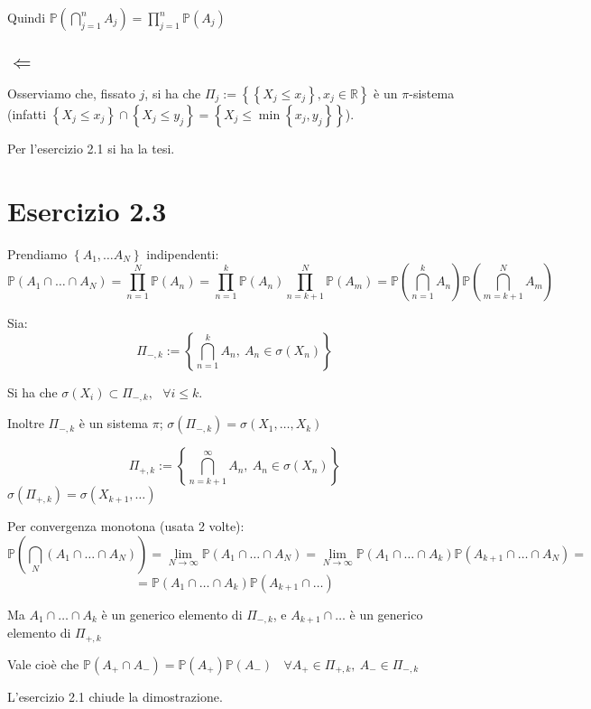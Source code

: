 \documentclass{article}
\begin{document}
Quindi $\mathbb{P}\left(\bigcap_{j=1}^{n} A_j\right) = \prod_{j=1}^{n} \mathbb{P}(A_j)$

\subsection{$\Leftarrow $}
Osserviamo che, fissato $j$, si ha che $\Pi_j := \left\{\left\{X_j \leq  x_j\right\}, x_j \in \mathbb{R}\right\}$ è un $\pi$-sistema (infatti $\left\{X_j \leq  x_j\right\} \cap \left\{X_j \leq  y_j\right\} = \left\{X_j \leq  \min\left\{x_j, y_j\right\}\right\}$).

Per l'esercizio 2.1 si ha la tesi.

\section{Esercizio 2.3}
Prendiamo $\left\{A_1,\dots A_N\right\}$ indipendenti:
\[
	\mathbb{P}\left(A_1\cap \dots \cap A_N\right) = \prod_{n=1}^{N}\mathbb{P}(A_n) = \prod_{n=1}^{k}\mathbb{P}(A_n)\prod_{n=k+1}^{N}\mathbb{P}(A_m)=\mathbb{P}\left(\bigcap_{n=1}^{k} A_n\right) \mathbb{P}\left(\bigcap _{m=k+1}^N A_m\right)
\]

Sia:
\[\Pi _{-,k} := \left\{\bigcap _{n=1}^k A_n,\ A_n\in \sigma (X_n)\right\}\]

Si ha che $\sigma (X_i) \subset \Pi _{-,k},\ \ \ \forall i\leq k$.

Inoltre $\Pi _{-,k}$ è un sistema $\pi $;    $\sigma (\Pi _{-,k}) = \sigma (X_1,\dots,X_k)$

\[\Pi _{+,k} := \left\{\bigcap _{n=k+1}^\infty  A_n,\ A_n\in \sigma (X_n)\right\}\]
$\sigma (\Pi _{+,k}) = \sigma (X_{k+1},\dots)$

Per convergenza monotona (usata 2 volte):
\[
	\mathbb{P}\left(\bigcap _N \left(A_1 \cap \dots \cap A_N\right)\right) = \lim_{N\rightarrow \infty }\mathbb{P}\left(A_1\cap \dots\cap A_N\right) = \lim_{N\rightarrow \infty } \mathbb{P}\left(A_1\cap \dots\cap A_k\right)\mathbb{P}\left(A_{k+1}\cap \dots\cap A_N\right) =
\]
\[
	= \mathbb{P}\left(A_1\cap \dots\cap A_k\right)\mathbb{P}\left(A_{k+1}\cap \dots\right)   
\]

Ma $A_1\cap \dots\cap A_k$ è un generico elemento di $\Pi _{-,k}$, e $A_{k+1}\cap \dots$ è un generico elemento di $\Pi _{+,k}$

Vale cioè che $\mathbb{P}\left(A_+\cap A_-\right) = \mathbb{P}\left(A_+\right)\mathbb{P}\left(A_-\right)\ \ \ \ \forall A_+\in \Pi _{+,k},\ A_-\in \Pi _{-,k}$

L'esercizio 2.1 chiude la dimostrazione.
\end{document}

